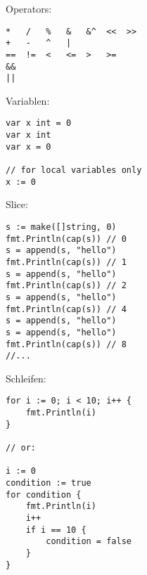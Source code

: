 \documentclass{beamer}
\begin{document}
\begin{frame}[fragile]
	\begin{center}
		Operators:
	\end{center}
	\begin{verbatim}
*   /   %   &   &^  <<  >>
+   -   ^   |
==  !=  <   <=  >   >=
&&
||
	\end{verbatim}
\end{frame}
	
	
	\begin{frame}[fragile]{}
		\begin{center}
			Variablen:
		\end{center}
		\begin{verbatim}
var x int = 0
var x int
var x = 0

// for local variables only
x := 0
		\end{verbatim}
\end{frame}
	
	
	\begin{frame}[fragile]{}
		\begin{center}
			Slice:
		\end{center}
		\begin{verbatim}
s := make([]string, 0)
fmt.Println(cap(s)) // 0
s = append(s, "hello")
fmt.Println(cap(s)) // 1
s = append(s, "hello")
fmt.Println(cap(s)) // 2
s = append(s, "hello")
fmt.Println(cap(s)) // 4
s = append(s, "hello")
s = append(s, "hello")
fmt.Println(cap(s)) // 8
//...
		\end{verbatim}
\end{frame}
	
	
	\begin{frame}[fragile]{}
		\begin{center}
			Schleifen:
		\end{center}
		\begin{verbatim}
for i := 0; i < 10; i++ {
	fmt.Println(i)
}

// or:

i := 0
condition := true
for condition {
	fmt.Println(i)
	i++
	if i == 10 {
		condition = false
	}
}
		\end{verbatim}
\end{frame}
	
\end{document}
